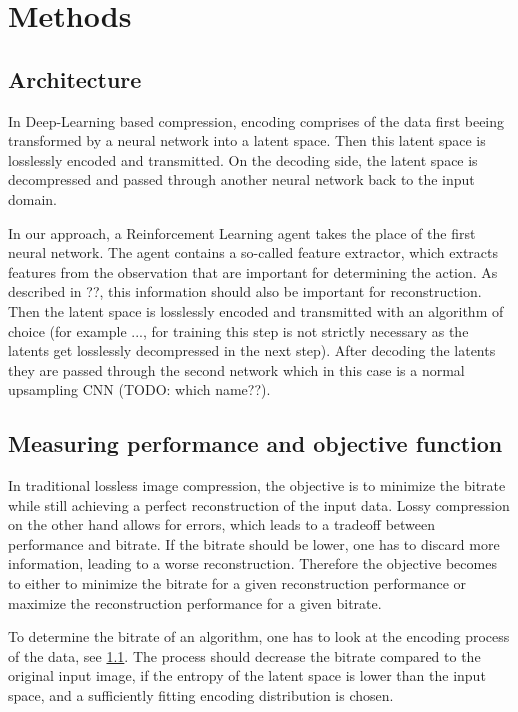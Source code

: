 \section{Methods}

\subsection{Architecture}\label{methods:Architecture}
    In Deep-Learning based compression, encoding comprises of the data first
    beeing transformed by a neural network into a latent space. Then this latent
    space is losslessly encoded and transmitted. On the decoding side, the
    latent space is decompressed and passed through another neural network back
    to the input domain.

    In our approach, a Reinforcement Learning agent takes the place of the first
    neural network. The agent contains a so-called feature extractor, which
    extracts features from the observation that are important for determining
    the action. As described in ??, this information should also be important
    for reconstruction. Then the latent space is losslessly encoded and
    transmitted with an algorithm of choice (for example ..., for training this
    step is not strictly necessary as the latents get losslessly decompressed in
    the next step). After decoding the latents they are passed through the
    second network which in this case is a normal upsampling CNN (TODO: which name??). 

\subsection{Measuring performance and objective function}
    In traditional lossless image compression, the objective is to minimize the
    bitrate while still achieving a perfect reconstruction of the input data. Lossy
    compression on the other hand allows for errors, which leads to a tradeoff
    between performance and bitrate. If the bitrate should be lower, one has to
    discard more information, leading to a worse reconstruction. Therefore the
    objective becomes to either to minimize the bitrate for a given reconstruction
    performance or maximize the reconstruction performance for a given bitrate.

    To determine the bitrate of an algorithm, one has to look at the encoding
    process of the data, see \ref{methods:Architecture}. The process should
    decrease the bitrate compared to the original input image, if the entropy of
    the latent space is lower than the input space, and a sufficiently fitting
    encoding distribution is chosen.

